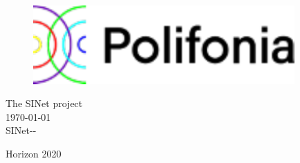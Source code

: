 \label{finalpg}
\clearpage

\thispagestyle{empty}
\begin{center}
\vfill
\begin{figure}
\centering
\vspace{3cm}
  \includegraphics[width=10cm]{images/polifonia}
\end{figure}
\vfill
{\large The SINet project\\[0.5cm] }
{\large \today \\[0.5cm] }
{\large SINet-\DelNumber-\DelVersion\\[0.5cm] }
\vfill

Horizon 2020

\doclicenseLicense
\end{center}
